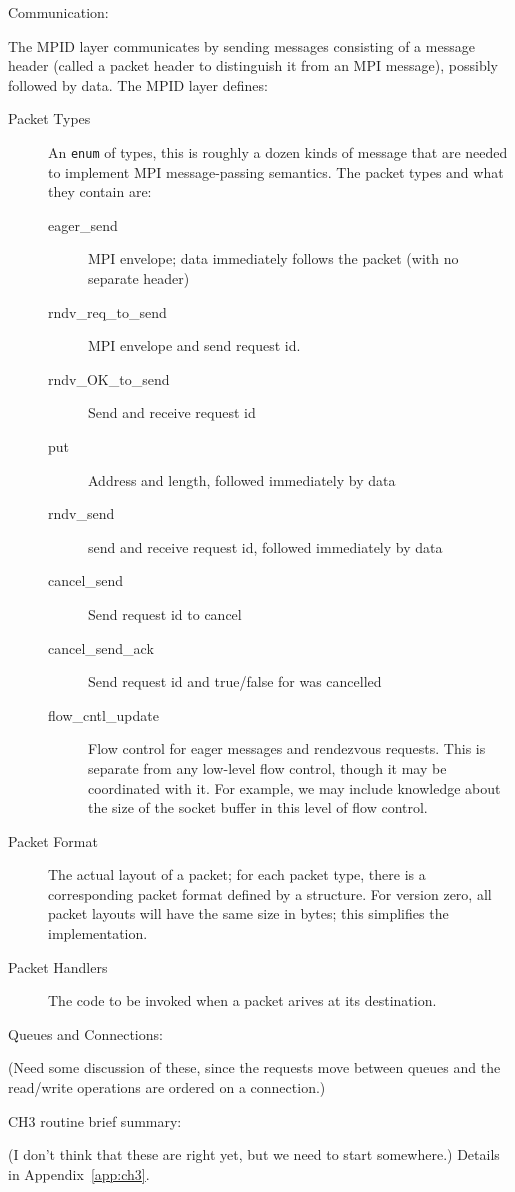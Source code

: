 \documentclass{article}
\def\code#1{\texttt{#1}}
\begin{document}
Communication:

The MPID layer communicates by sending messages consisting of a message header
(called a packet header to distinguish it from an MPI message), possibly
followed by data.  The MPID layer defines:
\begin{description}
\item[Packet Types]An \code{enum} of types, this is roughly a dozen kinds of
  message that are needed to implement MPI message-passing semantics.  The
  packet types and what they contain are:
  \begin{description}
    \item[eager_send] MPI envelope; data immediately follows the packet (with
      no separate header)
    \item[rndv_req_to_send]MPI envelope and send request id.
    \item[rndv_OK_to_send]Send and receive request id
    \item[put]Address and length, followed immediately by data
    \item[rndv_send]send and receive request id, followed immediately by data
    \item[cancel_send]Send request id to cancel
    \item[cancel_send_ack]Send request id and true/false for was cancelled
    \item[flow_cntl_update]Flow control for eager messages and rendezvous
      requests.  This is separate from any low-level flow control, though it
      may be coordinated with it.  For example, we may include knowledge about
      the size of the socket buffer in this level of flow control.
    \end{description}
\item[Packet Format]The actual layout of a packet; for each packet type, there
  is a corresponding packet format defined by a structure.  For version zero,
  all packet layouts will have the same size in bytes; this simplifies
  the implementation.
\item[Packet Handlers]The code to be invoked when a packet arives at its
  destination. 
\end{description}

Queues and Connections:

(Need some discussion of these, since the requests move between queues and the 
read/write operations are ordered on a connection.)

CH3 routine brief summary:

(I don't think that these are right yet, but we need to start somewhere.)
Details in Appendix~\ref{app:ch3}.
\end{document}
